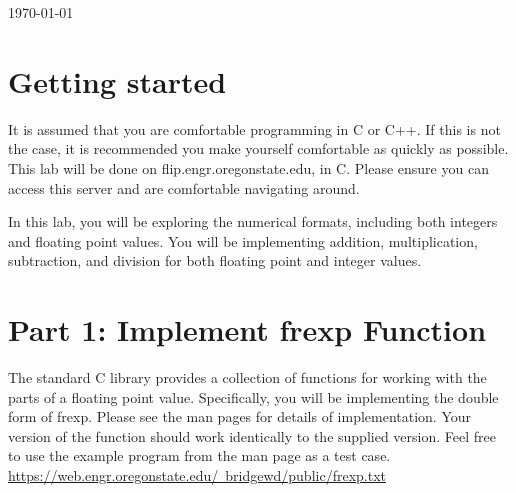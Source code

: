 \documentclass[letterpaper,12pt,titlepage]{article}
\begin{document}
\begin{titlepage}

{\large \today}\\[3cm] %


 

\vfill %

\end{titlepage}


\section*{Getting started}
It is assumed that you are comfortable programming in C or C++. If this is not the case, it is recommended you make yourself comfortable as quickly as possible. This lab will be done on flip.engr.oregonstate.edu, in C. Please ensure you can access this server and are comfortable navigating around.

In this lab, you will be exploring the numerical formats, including both integers and floating point values. You will be implementing addition, multiplication, subtraction, and division for both floating point and integer values.

\section*{Part 1: Implement frexp Function}
The standard C library provides a collection of functions for working with the parts of a floating point value. Specifically, you will be implementing the double form of frexp. Please see the man pages for details of implementation. Your version of the function should work identically to the supplied version. Feel free to use the example program from the man page as a test case.  \hyperref[frexp]{https://web.engr.oregonstate.edu/~bridgewd/public/frexp.txt}
\end{document}
